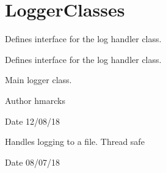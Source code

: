 \hypertarget{group__LoggerClasses}{}\section{Logger\+Classes}
\label{group__LoggerClasses}


Defines interface for the log handler class.  


Defines interface for the log handler class. 

Main logger class.

\begin{DoxyAuthor}{Author}
hmarcks 
\end{DoxyAuthor}
\begin{DoxyDate}{Date}
12/08/18
\end{DoxyDate}
Handles logging to a file. Thread safe

\begin{DoxyDate}{Date}
08/07/18 
\end{DoxyDate}
